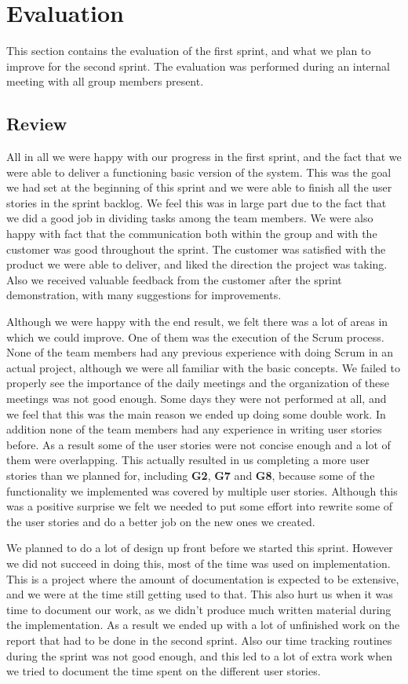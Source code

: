 \section{Evaluation}
This section contains the evaluation of the first sprint, and what we plan to improve for the second sprint. The evaluation was performed during an internal meeting with all group members present.

\subsection{Review}
All in all we were happy with our progress in the first sprint, and the fact that we were able to deliver a functioning basic version of the system. This was the goal we had set at the beginning of this sprint and we were able to finish all the user stories in the sprint backlog. We feel this was in large part due to the fact that we did a good job in dividing tasks among the team members. We were also happy with fact that the communication both within the group and with the customer was good throughout the sprint. The customer was satisfied with the product we were able to deliver, and liked the direction the project was taking. Also we received valuable feedback from the customer after the sprint demonstration, with many suggestions for improvements.

Although we were happy with the end result, we felt there was a lot of areas in which we could improve. One of them was the execution of the Scrum process. None of the team members had any previous experience with doing Scrum in an actual project, although we were all familiar with the basic concepts. We failed to properly see the importance of the daily meetings and the organization of these meetings was not good enough. Some days they were not performed at all, and we feel that this was the main reason we ended up doing some double work. In addition none of the team members had any experience in writing user stories before. As a result some of the user stories were not concise enough and a lot of them were overlapping. This actually resulted in us completing a more user stories than we planned for, including \textbf{G2}, \textbf{G7} and \textbf{G8}, because some of the functionality we implemented was covered by multiple user stories. Although this was a positive surprise we felt we needed to put some effort into rewrite some of the user stories and do a better job on the new ones we created.

We planned to do a lot of design up front before we started this sprint. However we did not succeed in doing this, most of the time was used on implementation. This is a project where the amount of documentation is expected to be extensive, and we were at the time still getting used to that. This also hurt us when it was time to document our work, as we didn't produce much written material during the implementation. As a result we ended up with a lot of unfinished work on the report that had to be done in the second sprint. Also our time tracking routines during the sprint was not good enough, and this led to a lot of extra work when we tried to document the time spent on the different user stories.

